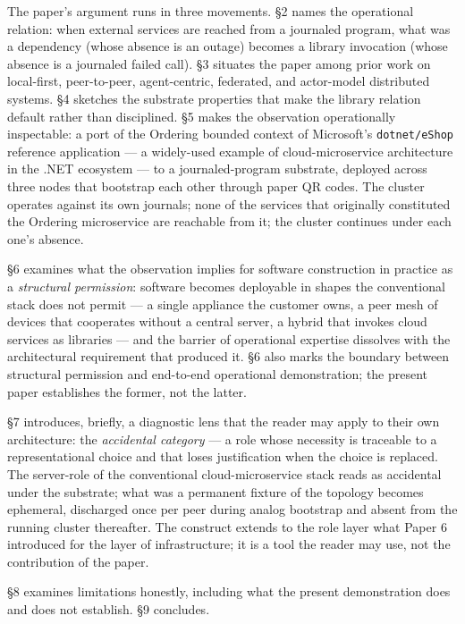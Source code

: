 \documentclass[
]{article}
\newcounter{none} %
\begin{document}
The paper's argument runs in three movements. §2 names the operational
relation: when external services are reached from a journaled program,
what was a dependency (whose absence is an outage) becomes a library
invocation (whose absence is a journaled failed call). §3 situates the
paper among prior work on local-first, peer-to-peer, agent-centric,
federated, and actor-model distributed systems. §4 sketches the
substrate properties that make the library relation default rather than
disciplined. §5 makes the observation operationally inspectable: a port
of the Ordering bounded context of Microsoft's \texttt{dotnet/eShop}
reference application --- a widely-used example of cloud-microservice
architecture in the .NET ecosystem --- to a journaled-program substrate,
deployed across three nodes that bootstrap each other through paper QR
codes. The cluster operates against its own journals; none of the
services that originally constituted the Ordering microservice are
reachable from it; the cluster continues under each one's absence.

§6 examines what the observation implies for software construction in
practice as a \emph{structural permission}: software becomes deployable
in shapes the conventional stack does not permit --- a single appliance
the customer owns, a peer mesh of devices that cooperates without a
central server, a hybrid that invokes cloud services as libraries ---
and the barrier of operational expertise dissolves with the
architectural requirement that produced it. §6 also marks the boundary
between structural permission and end-to-end operational demonstration;
the present paper establishes the former, not the latter.

§7 introduces, briefly, a diagnostic lens that the reader may apply to
their own architecture: the \emph{accidental category} --- a role whose
necessity is traceable to a representational choice and that loses
justification when the choice is replaced. The server-role of the
conventional cloud-microservice stack reads as accidental under the
substrate; what was a permanent fixture of the topology becomes
ephemeral, discharged once per peer during analog bootstrap and absent
from the running cluster thereafter. The construct extends to the role
layer what Paper 6 introduced for the layer of infrastructure; it is a
tool the reader may use, not the contribution of the paper.

§8 examines limitations honestly, including what the present
demonstration does and does not establish. §9 concludes.
\end{document}
